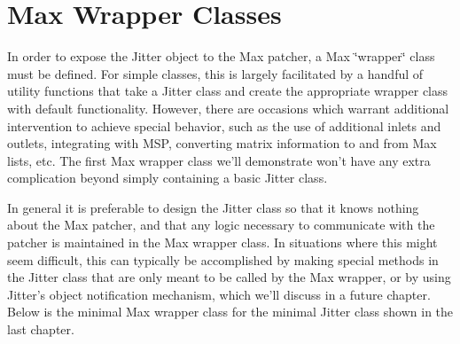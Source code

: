 \hypertarget{chapter_jit_maxwrappers_chapter_jit_maxwrappers_classes}{}\section{Max Wrapper Classes}\label{chapter_jit_maxwrappers_chapter_jit_maxwrappers_classes}
In order to expose the Jitter object to the Max patcher, a Max \char`\"{}wrapper\char`\"{} class must be defined. For simple classes, this is largely facilitated by a handful of utility functions that take a Jitter class and create the appropriate wrapper class with default functionality. However, there are occasions which warrant additional intervention to achieve special behavior, such as the use of additional inlets and outlets, integrating with MSP, converting matrix information to and from Max lists, etc. The first Max wrapper class we'll demonstrate won't have any extra complication beyond simply containing a basic Jitter class.

In general it is preferable to design the Jitter class so that it knows nothing about the Max patcher, and that any logic necessary to communicate with the patcher is maintained in the Max wrapper class. In situations where this might seem difficult, this can typically be accomplished by making special methods in the Jitter class that are only meant to be called by the Max wrapper, or by using Jitter's object notification mechanism, which we'll discuss in a future chapter. Below is the minimal Max wrapper class for the minimal Jitter class shown in the last chapter.


